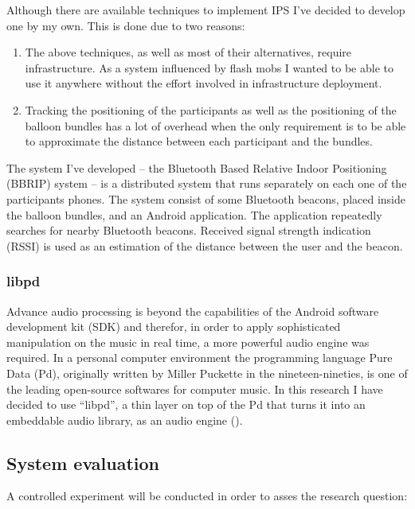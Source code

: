 Although there are available techniques to implement IPS I've decided to develop one by my own. This is done due to two reasons:
\begin{enumerate}
	\item The above techniques, as well as most of their alternatives, require infrastructure. As a system influenced by flash mobs I wanted to be able to use it anywhere without the effort involved in infrastructure deployment.
	\item Tracking the positioning of the participants as well as the positioning of the balloon bundles has a lot of overhead when the only requirement is to be able to approximate the distance between each participant and the bundles.
\end{enumerate}


The system I've developed -- the Bluetooth Based Relative Indoor Positioning (BBRIP) system -- is a distributed system that runs separately on each one of the participants phones. The system consist of some Bluetooth beacons, placed inside the balloon bundles, and an Android application. The application repeatedly searches for nearby Bluetooth beacons. Received signal strength indication (RSSI) is used as an estimation of the distance between the user and the beacon.

\subsubsection{libpd}\label{methods:libpd}

Advance audio processing is beyond the capabilities of the Android software development kit (SDK) and therefor, in order to apply sophisticated manipulation on the music in real time, a more powerful audio engine was required. In a personal computer environment the programming language Pure Data (Pd), originally written by Miller Puckette in the nineteen-nineties, is one of the leading open-source softwares for computer music. In this research I have decided to use ``libpd'', a thin layer on top of the Pd that turns it into an embeddable audio library, as an audio engine ().

\subsection{System evaluation}

A controlled experiment will be conducted in order to asses the research question: \emph{\reserchquestion}

